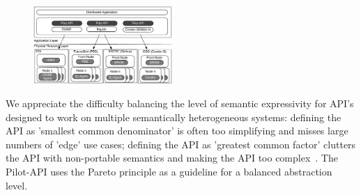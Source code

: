 \documentclass[conference]{IEEEtran}
\begin{document}
\begin{figure}[b]
    \begin{center}
    \up\up
    \includegraphics[width=0.47\textwidth]{../figures/distributed_pilot_job.pdf}
    \caption{\label{fig:figures_distributed_pilot_job}}
  \end{center}
    
\end{figure}

We appreciate the difficulty balancing the level of semantic
expressivity for API's designed to work on multiple semantically
heterogeneous systems: defining the API as 'smallest common
denominator' is often too simplifying and misses large numbers of
'edge' use cases; defining the API as 'greatest common factor'
clutters the API with non-portable semantics and making the API too
complex~\cite{leaky_abstractions}.  The Pilot-API uses the Pareto
principle as a guideline for a balanced abstraction level.




\end{document}
